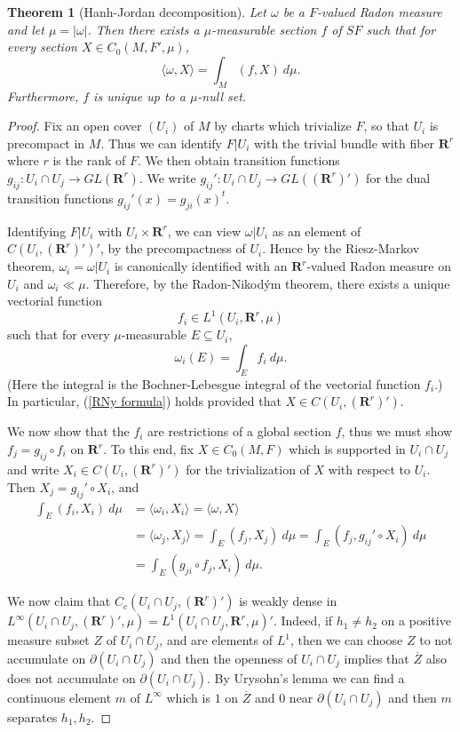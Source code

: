 \documentclass[reqno,12pt,letterpaper]{amsart}
\newcommand{\RR}{\mathbf{R}}
\newtheorem{theorem}{Theorem}[section]
\theoremstyle{definition}
\numberwithin{equation}{section}
\begin{document}
\begin{theorem}[Hanh-Jordan decomposition]
Let $\omega$ be a $F$-valued Radon measure and let $\mu = |\omega|$.
Then there exists a $\mu$-measurable section $f$ of $SF$ such that for every section $X \in C_0(M, F', \mu)$,
\begin{equation}\label{RNy formula}
\langle \omega, X\rangle = \int_M (f, X) ~d\mu.
\end{equation}
Furthermore, $f$ is unique up to a $\mu$-null set.
\end{theorem}
\begin{proof}
Fix an open cover $(U_i)$ of $M$ by charts which trivialize $F$, so that $U_i$ is precompact in $M$.
Thus we can identify $F|U_i$ with the trivial bundle with fiber $\RR^r$ where $r$ is the rank of $F$.
We then obtain transition functions $g_{ij}: U_i \cap U_j \to GL(\RR^r)$.
We write $g_{ij}': U_i \cap U_j \to GL((\RR^r)')$ for the dual transition functions $g_{ij}'(x) = g_{ji}(x)^t$.

Identifying $F|U_i$ with $U_i \times \RR^r$, we can view $\omega|U_i$ as an element of $C(U_i, (\RR^r)')'$, by the precompactness of $U_i$.
Hence by the Riesz-Markov theorem, $\omega_i = \omega|U_i$ is canonically identified with an $\RR^r$-valued Radon measure on $U_i$ and $\omega_i \ll \mu$.
Therefore, by the Radon-Nikod\'ym theorem, there exists a unique vectorial function
$$f_i \in L^1(U_i, \RR^r, \mu)$$
such that for every $\mu$-measurable $E \subseteq U_i$,
$$\omega_i(E) = \int_E f_i ~d\mu.$$
(Here the integral is the Bochner-Lebesgue integral of the vectorial function $f_i$.)
In particular, (\ref{RNy formula}) holds provided that $X \in C(U_i, (\RR^r)')$.

We now show that the $f_i$ are restrictions of a global section $f$, thus we must show $f_j = g_{ij} \circ f_i$ on $\RR^r$.
To this end, fix $X \in C_0(M, F)$ which is supported in $U_i \cap U_j$ and write $X_i \in C(U_i, (\RR^r)')$ for the trivialization of $X$ with respect to $U_i$.
Then $X_j = g_{ij}' \circ X_i$, and
\begin{align*}
\int_E (f_i, X_i) ~d\mu &= \langle \omega_i, X_i\rangle = \langle \omega, X\rangle\\
&= \langle \omega_j, X_j\rangle = \int_E (f_j, X_j) ~d\mu = \int_E (f_j, g_{ij}' \circ X_i) ~d\mu \\
&= \int_E (g_{ji} \circ f_j, X_i) ~d\mu.
\end{align*}

We now claim that $C_c(U_i \cap U_j, (\RR^r)')$ is weakly dense in $L^\infty(U_i \cap U_j, (\RR^r)', \mu) = L^1(U_i \cap U_j, \RR^r, \mu)'.$
Indeed, if $h_1 \neq h_2$ on a positive measure subset $Z$ of $U_i \cap U_j$, and are elements of $L^1$, then we can choose $Z$ to not accumulate on $\partial(U_i \cap U_j)$ and then the openness of $U_i \cap U_j$ implies that $\overline Z$ also does not accumulate on $\partial(U_i \cap U_j)$.
By Urysohn's lemma we can find a continuous element $m$ of $L^\infty$ which is $1$ on $\overline Z$ and $0$ near $\partial(U_i \cap U_j)$ and then $m$ separates $h_1,h_2$.


\end{proof}
\end{document}
